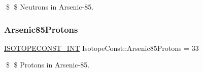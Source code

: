 \$ \$ Neutrons in Arsenic-\/85. \mbox{\label{group___isotope_const-_arsenic-_as85_ga63ec13397f0bd9fcf4fbee03e6190282}} 
\subsubsection{\texorpdfstring{Arsenic85\+Protons}{Arsenic85Protons}}
{\footnotesize\ttfamily \mbox{\hyperlink{group___isotope_const-_macros_ga5f18360b3e99483a35c32d789e62621c}{I\+S\+O\+T\+O\+P\+E\+C\+O\+N\+S\+T\+\_\+\+I\+NT}} Isotope\+Const\+::\+Arsenic85\+Protons = 33}

\$ \$ Protons in Arsenic-\/85. 